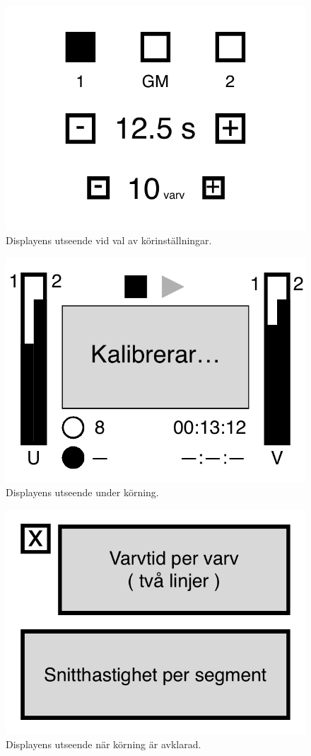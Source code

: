 \begin{figure}
  \centering
  \includegraphics{figures/innan}
  \caption{Displayens utseende vid val av körinställningar.}
  \label{fig:disp:before}
\end{figure}
\begin{figure}
  \centering
  \includegraphics{figures/under}
  \caption{Displayens utseende under körning.}
  \label{fig:disp:during}
\end{figure}
\begin{figure}
  \centering
  \includegraphics{figures/efter}
  \caption{Displayens utseende när körning är avklarad.}
  \label{fig:disp:after}
\end{figure}
